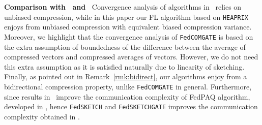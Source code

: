 \documentclass[sigconf, anonymous, review]{acmart}
\begin{document}
\noindent\textbf{Comparison  with~\citep{haddadpour2020federated} and~\citep{reisizadeh2020fedpaq}}
Convergence analysis of algorithms in~\citep{haddadpour2020federated} relies on unbiased compression, while in this paper our FL algorithm based on \texttt{HEAPRIX} enjoys from unbiased compression with equivalent biased compression variance. Moreover, we highlight that the convergence analysis of \texttt{FedCOMGATE} is based on the extra assumption of boundedness of the difference between the average of compressed vectors and compressed averages of vectors. 
However, we do not need this extra assumption as it is satisfied naturally due to linearity of sketching. 
Finally, as pointed out in Remark~\ref{rmk:bidirect}, our algorithms enjoy from a bidirectional compression property, unlike \texttt{FedCOMGATE} in general. 
Furthermore, since results in~\citep{haddadpour2020federated} improve the communication complexity of FedPAQ algorithm, developed in \citep{reisizadeh2020fedpaq}, hence \texttt{FedSKETCH} and \texttt{FedSKETCHGATE} improves the communication complexity obtained in \citep{reisizadeh2020fedpaq}. 
\end{document}
